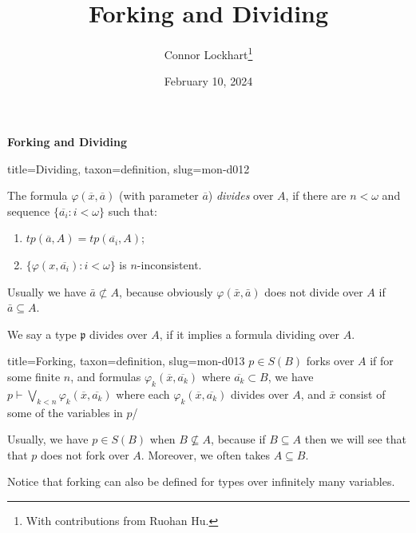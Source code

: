\documentclass[a4paper]{article}
\title{Forking and Dividing}
\date{February 10, 2024}
\author{Connor Lockhart\thanks{With contributions from Ruohan Hu.}}
\begin{document}
\maketitle
\par{\textbf{Forking and Dividing}}
\begin{tree}{title={Dividing}, taxon={definition}, slug={mon-d012}}

The formula \(\varphi ( \overline {x}, \overline {a})\) (with parameter \(\overline {a}\)) \emph{divides} over \(A\), if there are \(n< \omega\) and sequence \(\{ \overline {a_i}:i< \omega \}\) such that:
\begin{enumerate}
\item{\(tp( \overline {a},A)=tp( \overline {a_i},A)\);}
    \item{\(\{ \varphi (x, \overline {a_i}):i< \omega \}\) is \(n\)-inconsistent.}
\end{enumerate}
Usually we have \(\bar {a} \not \subset  A\), because obviously \(\varphi ( \bar {x}, \bar {a})\) does not divide over \(A\) if \(\bar {a} \subseteq  A\).

We say a type \(\mathfrak {p}\) divides over \(A\), if it implies a formula dividing over \(A\).

\end{tree}

\begin{tree}{title={Forking}, taxon={definition}, slug={mon-d013}}
 \(p \in  S(B)\) forks over \(A\) if for some finite \(n\), and formulas \(\varphi _k( \overline {x}, \overline {a_{k}})\) where \(\overline {a_k} \subset  B\), we have \(p \vdash \bigvee _{k<n} \varphi _k( \overline {x}, \overline {a_{k}})\) where each \(\varphi _k( \overline {x}, \overline {a_{k}})\) divides over \(A\), and \(\bar {x}\) consist of some of the variables in \(p\)/

Usually, we have \(p \in  S(B)\) when \(B \not \subseteq  A\), because if \(B \subseteq  A\) then we will see that that \(p\) does not fork over \(A\). Moreover, we often takes \(A \subseteq  B\).

Notice that forking can also be defined for types over infinitely many variables.

\end{tree}

\printbibliography
\end{document}
